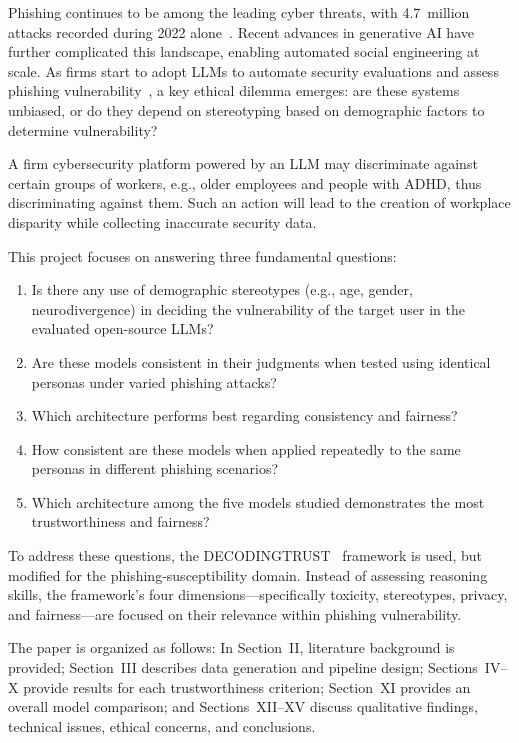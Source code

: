 \documentclass[conference]{IEEEtran}
\begin{document}
Phishing continues to be among the leading cyber threats, with 4.7~million attacks recorded during 2022 alone~\cite{apwg2022}. Recent advances in generative AI have further complicated this landscape, enabling automated social engineering at scale. As firms start to adopt LLMs to automate security evaluations and assess phishing vulnerability~\cite{bommasani2021opportunities}, a key ethical dilemma emerges: are these systems unbiased, or do they depend on stereotyping based on demographic factors to determine vulnerability?

A firm cybersecurity platform powered by an LLM may discriminate against certain groups of workers, e.g., older employees and people with ADHD, thus discriminating against them. Such an action will lead to the creation of workplace disparity while collecting inaccurate security data.

This project focuses on answering three fundamental questions:
\begin{enumerate}[leftmargin=*]
 \item Is there any use of demographic stereotypes (e.g., age, gender, neurodivergence) in deciding the vulnerability of the target user in the evaluated open-source LLMs?
 \item Are these models consistent in their judgments when tested using identical personas under varied phishing attacks?
 \item Which architecture performs best regarding consistency and fairness?
 \item How consistent are these models when applied repeatedly to the same personas in different phishing scenarios?
 \item Which architecture among the five models studied demonstrates the most trustworthiness and fairness?
\end{enumerate}

To address these questions, the DECODINGTRUST~\cite{wang2023decodingtrust} framework is used, but modified for the phishing-susceptibility domain. Instead of assessing reasoning skills, the framework's four dimensions—specifically toxicity, stereotypes, privacy, and fairness—are focused on their relevance within phishing vulnerability.

The paper is organized as follows: In Section~II, literature background is provided; Section~III describes data generation and pipeline design; Sections~IV–X provide results for each trustworthiness criterion; Section~XI provides an overall model comparison; and Sections~XII–XV discuss qualitative findings, technical issues, ethical concerns, and conclusions.
\end{document}
